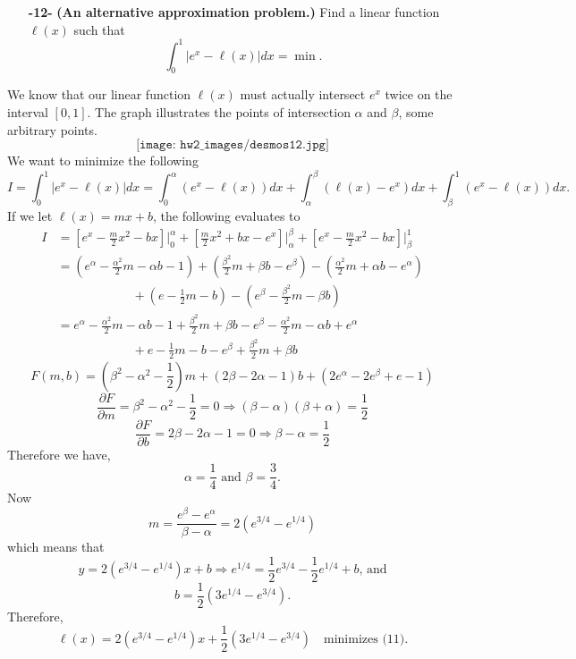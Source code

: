\documentclass[11pt]{article}
\theoremstyle{definition}
\newcommand{\1}[1]{\mathbf{1} \left \{ #1 \right \}}
\begin{document}
\begin{itemize}
    \item[{\textbf{-12-}}] \textbf{(An alternative approximation problem.)}  Find a linear function $\ell(x)$ such that
    \begin{equation}
        \int_0^1 |e^x - \ell(x)| dx = \min.
    \end{equation}
\end{itemize}
We know that our linear function $\ell(x)$ must actually intersect $e^x$ twice on the interval $[0,1]$.  The graph illustrates the points of intersection $\alpha$ and $\beta$, some arbitrary points.
\[\texttt{[image: hw2\_images/desmos12.jpg]}\]
We want to minimize the following
\[I = \int_0^1 |e^x - \ell(x)| dx = \int_0^{\alpha} (e^x - \ell(x)) dx + \int_{\alpha}^{\beta} (\ell(x) - e^x) dx + \int_{\beta}^1 (e^x - \ell(x)) dx.\]
If we let $\ell(x) = mx+b$, the following evaluates to
\begin{equation*}
    \begin{split}
        I &= \left[e^x - \frac{m}{2}x^2 - bx\right]\bigg|_0^{\alpha} + \left[\frac{m}{2}x^2 + bx - e^x\right]\bigg|_{\alpha}^{\beta} + \left[e^x - \frac{m}{2}x^2 - bx\right]\bigg|_{\beta}^1 \\
        &= \left(e^{\alpha} - \frac{\alpha^2}{2}m - \alpha b - 1\right) + \left(\frac{\beta^2}{2}m + \beta b - e^{\beta}\right) - \left(\frac{\alpha^2}{2}m + \alpha b - e^{\alpha}\right) \\
        & \qquad \qquad \qquad + \left(e - \frac{1}{2}m - b\right) - \left(e^{\beta} - \frac{\beta^2}{2}m - \beta b\right) \\
        &= e^{\alpha} - \frac{\alpha^2}{2}m - \alpha b - 1 + \frac{\beta^2}{2}m + \beta b - e^{\beta} - \frac{\alpha^2}{2}m - \alpha b + e^{\alpha} \\
        & \qquad \qquad \qquad + e - \frac{1}{2}m - b - e^{\beta} + \frac{\beta^2}{2}m + \beta b
    \end{split}
\end{equation*}
\[F(m,b) = \left(\beta^2 - \alpha^2 - \frac{1}{2}\right)m + \left(2\beta - 2\alpha - 1\right)b + \left(2e^{\alpha} - 2e^{\beta} + e - 1\right)\]
\[\frac{\partial F}{\partial m} = \beta^2 - \alpha^2 - \frac{1}{2} = 0 \Longrightarrow (\beta - \alpha)(\beta + \alpha) = \frac{1}{2}\]
\[\frac{\partial F}{\partial b} = 2\beta - 2\alpha - 1 = 0 \Longrightarrow \beta - \alpha = \frac{1}{2}\]
Therefore we have,
\[\alpha = \frac{1}{4} \text{  and  } \beta = \frac{3}{4}.\]
Now
\[m = \frac{e^{\beta} - e^{\alpha}}{\beta - \alpha} = 2\left(e^{3/4} - e^{1/4}\right)\]
which means that
\[y = 2\left(e^{3/4} - e^{1/4}\right)x + b \Longrightarrow e^{1/4} = \frac{1}{2}e^{3/4} - \frac{1}{2}e^{1/4} + b \text{, and}\]
\[b = \frac{1}{2}\left(3e^{1/4} - e^{3/4}\right).\]
Therefore,
\[\ell(x) = 2\left(e^{3/4} - e^{1/4}\right)x + \frac{1}{2}\left(3e^{1/4} - e^{3/4}\right) \quad \text{minimizes (11).}\]
\end{document}
